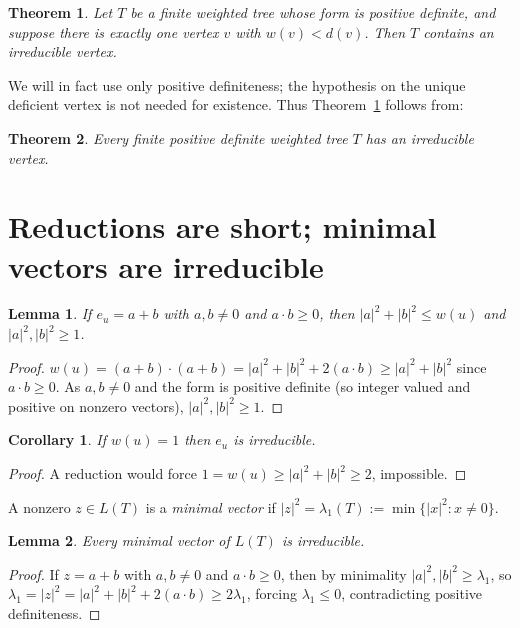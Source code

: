 \documentclass{article}
\newtheorem{theorem}{Theorem}
\newtheorem{lemma}{Lemma}
\newtheorem{corollary}{Corollary}
\theoremstyle{definition}
\begin{document}
\begin{theorem}\label{thm:main}
Let $T$ be a finite weighted tree whose form is positive definite, and suppose
there is exactly one vertex $v$ with $w(v)<d(v)$.  Then $T$ contains an
irreducible vertex.
\end{theorem}

We will in fact use only positive definiteness; the hypothesis on the unique
deficient vertex is not needed for existence.  Thus Theorem~\ref{thm:main}
follows from:

\begin{theorem}\label{thm:existence}
Every finite positive definite weighted tree $T$ has an irreducible vertex.
\end{theorem}

\section{Reductions are short; minimal vectors are irreducible}

\begin{lemma}\label{lem:short}
If $e_u=a+b$ with $a,b\neq 0$ and $a\cdot b\geq 0$, then
$|a|^2+|b|^2\leq w(u)$ and $|a|^2,|b|^2\geq 1$.
\end{lemma}

\begin{proof}
$w(u)=(a+b)\cdot(a+b)=|a|^2+|b|^2+2(a\cdot b)\geq|a|^2+|b|^2$ since
$a\cdot b\geq 0$.  As $a,b\neq 0$ and the form is positive definite (so
integer valued and positive on nonzero vectors), $|a|^2,|b|^2\geq 1$.
\end{proof}

\begin{corollary}\label{cor:weight1}
If $w(u)=1$ then $e_u$ is irreducible.
\end{corollary}

\begin{proof}
A reduction would force $1=w(u)\geq|a|^2+|b|^2\geq 2$, impossible.
\end{proof}

A nonzero $z\in L(T)$ is a \emph{minimal vector} if
$|z|^2=\lambda_1(T):=\min\{|x|^2:x\neq0\}$.

\begin{lemma}\label{lem:minimal}
Every minimal vector of $L(T)$ is irreducible.
\end{lemma}

\begin{proof}
If $z=a+b$ with $a,b\neq 0$ and $a\cdot b\geq 0$, then by minimality
$|a|^2,|b|^2\geq\lambda_1$, so
$\lambda_1=|z|^2=|a|^2+|b|^2+2(a\cdot b)\geq 2\lambda_1$, forcing
$\lambda_1\leq 0$, contradicting positive definiteness.
\end{proof}
\end{document}
